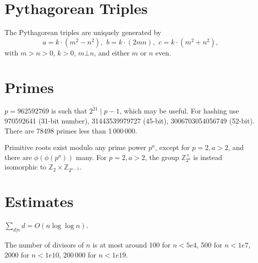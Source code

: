\section{Pythagorean Triples}
 The Pythagorean triples are uniquely generated by
 \[ a=k\cdot (m^{2}-n^{2}),\ \,b=k\cdot (2mn),\ \,c=k\cdot (m^{2}+n^{2}), \]
 with $m > n > 0$, $k > 0$, $m \bot n$, and either $m$ or $n$ even.

\section{Primes}
	$p=962592769$ is such that $2^{21} \mid p-1$, which may be useful. For hashing
	use 970592641 (31-bit number), 31443539979727 (45-bit), 3006703054056749
	(52-bit). There are 78498 primes less than 1\,000\,000.

	Primitive roots exist modulo any prime power $p^a$, except for $p = 2, a > 2$, and there are $\phi(\phi(p^a))$ many.
	For $p = 2, a > 2$, the group $\mathbb Z_{2^a}^\times$ is instead isomorphic to $\mathbb Z_2 \times \mathbb Z_{2^{a-2}}$.

\section{Estimates}
	$\sum_{d|n} d = O(n \log \log n)$.

	The number of divisors of $n$ is at most around 100 for $n < 5e4$, 500 for $n < 1e7$, 2000 for $n < 1e10$, 200\,000 for $n < 1e19$.
